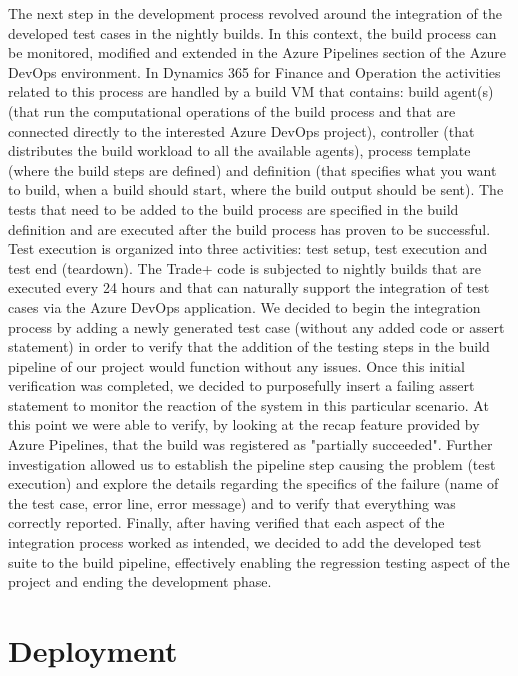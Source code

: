 The next step in the development process revolved around the integration of the developed test cases in the nightly builds. In this context, the build process can be monitored, modified and extended in the Azure Pipelines section of the Azure DevOps environment. In Dynamics 365 for Finance and Operation the activities related to this process are handled by a build VM that contains: build agent(s) (that run the computational operations of the build process and that are connected directly to the interested Azure DevOps project), controller (that distributes the build workload to all the available agents), process template (where the build steps are defined) and definition (that specifies what you want to build, when a build should start, where the build output should be sent). The tests that need to be added to the build process are specified in the build definition and are executed after the build process has proven to be successful. Test execution is organized into three activities: test setup, test execution and test end (teardown). The Trade+ code is subjected to nightly builds that are executed every 24 hours and that can naturally support the integration of test cases via the Azure DevOps application. We decided to begin the integration process by adding a newly generated test case (without any added code or assert statement) in order to verify that the addition of the testing steps in the build pipeline of our project would function without any issues. Once this initial verification was completed, we decided to purposefully insert a failing assert statement to monitor the reaction of the system in this particular scenario. At this point we were able to verify, by looking at the recap feature provided by Azure Pipelines, that the build was registered as "partially succeeded". Further investigation allowed us to establish the pipeline step causing the problem (test execution) and explore the details regarding the specifics of the failure (name of the test case, error line, error message) and to verify that everything was correctly reported. Finally, after having verified that each aspect of the integration process worked as intended, we decided to add the developed test suite to the build pipeline, effectively enabling the regression testing aspect of the project and ending the development phase.

\section{Deployment}

